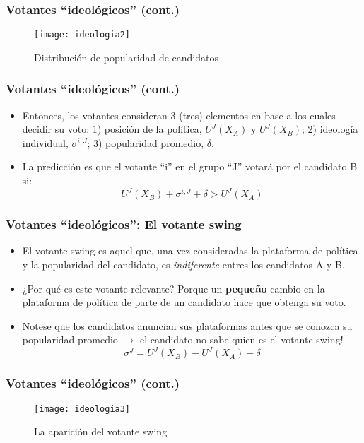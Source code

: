 \documentclass[14pt,aspectratio=169]{beamer}
\begin{document}
\begin{frame}\frametitle{Votantes ``ideológicos'' (cont.)}
\begin{figure}[htbp]
    \centering 
    \texttt{[image: ideologia2]}
    \caption{Distribución de popularidad de candidatos}
    \label{fig:baron1}
  \end{figure}
\end{frame}



\begin{frame}\frametitle{Votantes ``ideológicos'' (cont.)}
\begin{itemize}
\item Entonces, los votantes consideran 3 (tres) elementos en base a
  los cuales decidir su voto: 1) posición de la política,
  $U^{J}(X_{A})$ y $U^{J}(X_{B})$; 2) ideología
  individual, $\sigma^{i,J}$; 3) popularidad promedio, $\delta$.
\item La predicción es que el votante ``i'' en el grupo ``J'' votará por el
  candidato B si:
  \begin{equation}
U^{J}(X_{B})+\sigma^{i,J}+\delta > U^{J}(X_{A})
    \end{equation}
\end{itemize}
\end{frame}


\begin{frame}\frametitle{Votantes ``ideológicos'': El votante swing}
\begin{itemize}
\item El votante swing es aquel que, una vez consideradas la
  plataforma de política y la popularidad del candidato, es
  \textit{indiferente} entres los candidatos A y B.
  \item ¿Por qué es este votante relevante? Porque un
    \textbf{pequeño} cambio en la plataforma de política de parte de
      un candidato hace que obtenga su voto.
      \item Notese que los candidatos anuncian sus plataformas antes
        que se conozca su popularidad promedio $\longrightarrow$ el
        candidato no sabe quien es el votante swing!
        \begin{equation}
\sigma^{J}=U^{J}(X_{B})-U^{J}(X_{A})-\delta
          \end{equation}
               \end{itemize}
\end{frame}



\begin{frame}\frametitle{Votantes ``ideológicos'' (cont.)}
\begin{figure}[htbp]
    \centering 
    \texttt{[image: ideologia3]}
    \caption{La aparición del votante swing}
    \label{fig:baron1}
  \end{figure}
\end{frame}
\end{document}
